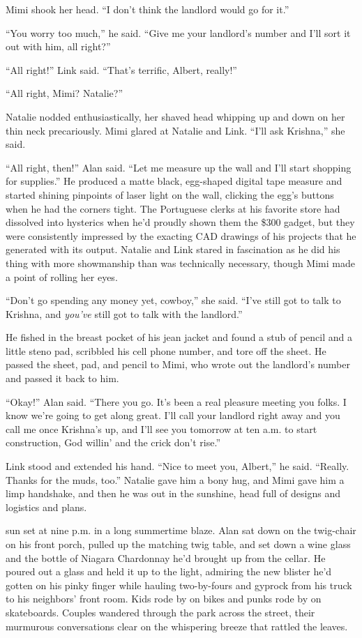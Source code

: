 Mimi shook her head.  ``I don't think the landlord would go for it.''

``You worry too much,'' he said.  ``Give me your landlord's number and
I'll sort it out with him, all right?''

``All right!'' Link said.  ``That's terrific, Albert, really!''

``All right, Mimi?  Natalie?''

Natalie nodded enthusiastically, her shaved head whipping up and down
on her thin neck precariously.  Mimi glared at Natalie and Link. 
``I'll ask Krishna,'' she said.

``All right, then!'' Alan said.  ``Let me measure up the wall and I'll
start shopping for supplies.'' He produced a matte black, egg-shaped
digital tape measure and started shining pinpoints of laser light on
the wall, clicking the egg's buttons when he had the corners tight. 
The Portuguese clerks at his favorite store had dissolved into
hysterics when he'd proudly shown them the \$300 gadget, but they were
consistently impressed by the exacting CAD drawings of his projects
that he generated with its output.  Natalie and Link stared in
fascination as he did his thing with more showmanship than was
technically necessary, though Mimi made a point of rolling her eyes.

``Don't go spending any money yet, cowboy,'' she said.  ``I've still
got to talk to Krishna, and \textit{you've} still got to talk with the
landlord.''

He fished in the breast pocket of his jean jacket and found a stub of
pencil and a little steno pad, scribbled his cell phone number, and
tore off the sheet.  He passed the sheet, pad, and pencil to Mimi, who
wrote out the landlord's number and passed it back to him.

``Okay!'' Alan said.  ``There you go.  It's been a real pleasure
meeting you folks.  I know we're going to get along great.  I'll call
your landlord right away and you call me once Krishna's up, and I'll
see you tomorrow at ten a.m.  to start construction, God willin' and
the crick don't rise.''

Link stood and extended his hand.  ``Nice to meet you, Albert,'' he
said.  ``Really.  Thanks for the muds, too.'' Natalie gave him a bony
hug, and Mimi gave him a limp handshake, and then he was out in the
sunshine, head full of designs and logistics and plans.

 sun set at nine p.m.  in a long summertime blaze.  Alan sat down
on the twig-chair on his front porch, pulled up the matching twig
table, and set down a wine glass and the bottle of Niagara Chardonnay
he'd brought up from the cellar.  He poured out a glass and held it up
to the light, admiring the new blister he'd gotten on his pinky finger
while hauling two-by-fours and gyprock from his truck to his
neighbors' front room.  Kids rode by on bikes and punks rode by on
skateboards.  Couples wandered through the park across the street,
their murmurous conversations clear on the whispering breeze that
rattled the leaves.

